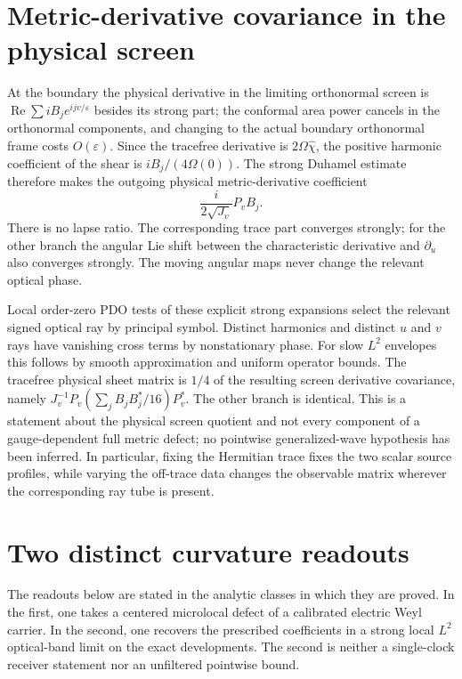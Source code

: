 \documentclass[11pt]{article}
\newcommand{\eps}{\varepsilon}
\begin{document}
\section{Metric-derivative covariance in the physical screen}
At the boundary the physical derivative in the limiting orthonormal screen is $\operatorname{Re}\sum iB_j e^{ijv/\eps}$ besides its strong part; the conformal area power cancels in the orthonormal components, and changing to the actual boundary orthonormal frame costs $O(\eps)$. Since the tracefree derivative is $2\Omega\widehat\chi$, the positive harmonic coefficient of the shear is $iB_j/(4\Omega(0))$. The strong Duhamel estimate therefore makes the outgoing physical metric-derivative coefficient
\[
 \frac{i}{2\sqrt{J_v}}P_vB_j.
\]
There is no lapse ratio. The corresponding trace part converges strongly; for the other branch the angular Lie shift between the characteristic derivative and $\partial_u$ also converges strongly. The moving angular maps never change the relevant optical phase.

Local order-zero PDO tests of these explicit strong expansions select the relevant signed optical ray by principal symbol. Distinct harmonics and distinct $u$ and $v$ rays have vanishing cross terms by nonstationary phase. For slow $L^2$ envelopes this follows by smooth approximation and uniform operator bounds. The tracefree physical sheet matrix is $1/4$ of the resulting screen derivative covariance, namely $J_v^{-1}P_v(\sum_j B_jB_j^*/16)P_v^*$. The other branch is identical. This is a statement about the physical screen quotient and not every component of a gauge-dependent full metric defect; no pointwise generalized-wave hypothesis has been inferred. In particular, fixing the Hermitian trace fixes the two scalar source profiles, while varying the off-trace data changes the observable matrix wherever the corresponding ray tube is present.

\section{Two distinct curvature readouts}
The readouts below are stated in the analytic classes in which they are proved. In the first, one takes a centered microlocal defect of a calibrated electric Weyl carrier. In the second, one recovers the prescribed coefficients in a strong local $L^2$ optical-band limit on the exact developments. The second is neither a single-clock receiver statement nor an unfiltered pointwise bound.
\end{document}
